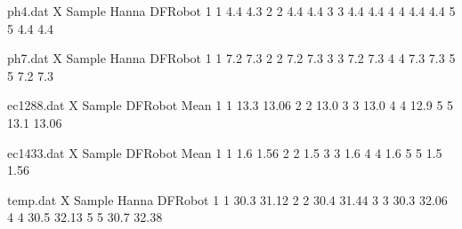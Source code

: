 \begin{filecontents}{ph4.dat}
X Sample  	Hanna  DFRobot	
1 1         	4.4	4.3
2 2         	4.4	4.4
3 3         	4.4	4.4
4 4         	4.4	4.4
5 5         	4.4	4.4
\end{filecontents}

\begin{filecontents}{ph7.dat}
X Sample  	Hanna  DFRobot	
1 1         	7.2	7.3
2 2         	7.2	7.3
3 3         	7.2	7.3
4 4         	7.3	7.3
5 5         	7.2	7.3
\end{filecontents}

\begin{filecontents}{ec1288.dat}
X Sample  	DFRobot   Mean
1 1         	13.3   13.06
2 2         	13.0
3 3         	13.0
4 4         	12.9
5 5         	13.1   13.06
\end{filecontents}

\begin{filecontents}{ec1433.dat}
X Sample  	DFRobot   Mean
1 1         	1.6   1.56
2 2         	1.5
3 3         	1.6
4 4         	1.6
5 5         	1.5   1.56
\end{filecontents}

\begin{filecontents}{temp.dat}
X Sample  	Hanna  DFRobot	
1 1         	30.3 31.12
2 2         	30.4 31.44
3 3         	30.3 32.06
4 4         	30.5 32.13
5 5         	30.7 32.38
\end{filecontents}